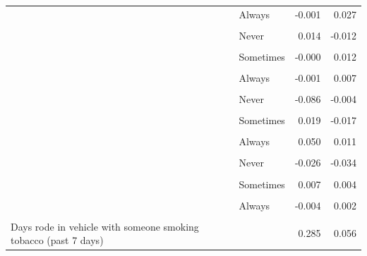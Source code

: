 \begin{longtable}[t]{>{\raggedright\arraybackslash}p{5cm}>{\raggedright\arraybackslash}p{5.5cm}rr}
 & Always & -0.001 & 0.027\\
\cellcolor{gray!6}{E-cig ads exposure: Newspapers/Magazines} & \cellcolor{gray!6}{I do not read newspapers or magazines} & \cellcolor{gray!6}{-0.029} & \cellcolor{gray!6}{-0.003}\\
\addlinespace
 & Never & 0.014 & -0.012\\
\cellcolor{gray!6}{} & \cellcolor{gray!6}{Rarely} & \cellcolor{gray!6}{0.018} & \cellcolor{gray!6}{-0.002}\\
 & Sometimes & -0.000 & 0.012\\
\cellcolor{gray!6}{} & \cellcolor{gray!6}{Most of the time} & \cellcolor{gray!6}{-0.001} & \cellcolor{gray!6}{-0.001}\\
 & Always & -0.001 & 0.007\\
\addlinespace
\cellcolor{gray!6}{E-cig ads exposure: Retail stores} & \cellcolor{gray!6}{Never go to a convenience store/etc.} & \cellcolor{gray!6}{0.001} & \cellcolor{gray!6}{0.010}\\
 & Never & -0.086 & -0.004\\
\cellcolor{gray!6}{} & \cellcolor{gray!6}{Rarely} & \cellcolor{gray!6}{-0.043} & \cellcolor{gray!6}{0.002}\\
 & Sometimes & 0.019 & -0.017\\
\cellcolor{gray!6}{} & \cellcolor{gray!6}{Most of the time} & \cellcolor{gray!6}{0.060} & \cellcolor{gray!6}{-0.001}\\
\addlinespace
 & Always & 0.050 & 0.011\\
\cellcolor{gray!6}{E-cig ads exposure: TV/Streaming/Movies} & \cellcolor{gray!6}{Do not watch TV/streaming or movies} & \cellcolor{gray!6}{-0.002} & \cellcolor{gray!6}{0.008}\\
 & Never & -0.026 & -0.034\\
\cellcolor{gray!6}{} & \cellcolor{gray!6}{Rarely} & \cellcolor{gray!6}{0.016} & \cellcolor{gray!6}{0.014}\\
 & Sometimes & 0.007 & 0.004\\
\addlinespace
\cellcolor{gray!6}{} & \cellcolor{gray!6}{Most of the time} & \cellcolor{gray!6}{0.009} & \cellcolor{gray!6}{0.007}\\
 & Always & -0.004 & 0.002\\
\cellcolor{gray!6}{Days someone smoked tobacco in home (past 7 days)} & \cellcolor{gray!6}{} & \cellcolor{gray!6}{0.276} & \cellcolor{gray!6}{0.071}\\
Days rode in vehicle with someone smoking tobacco (past 7 days) &  & 0.285 & 0.056\\

\end{longtable}
